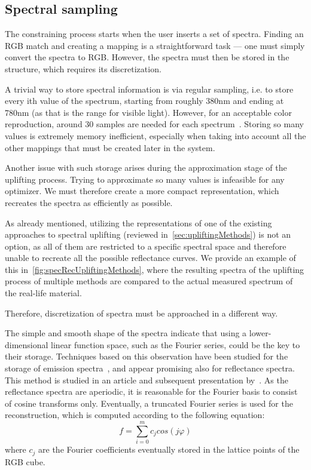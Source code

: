 \subsection{Spectral sampling}

The constraining process starts when the user inserts a set of spectra. Finding an RGB match and creating a mapping is a straightforward task --- one must simply convert the spectra to RGB. However, the spectra must then be stored in the structure, which requires its discretization.

A trivial way to store spectral information is via regular sampling, i.e. to store every ith value of the spectrum, starting from roughly 380nm and ending at 780nm (as that is the range for visible light). However, for an acceptable color reproduction, around 30 samples are needed for each spectrum~\cite{trigonometricMomentsPresentation}. Storing so many values is extremely memory inefficient, especially when taking into account all the other mappings that must be created later in the system.

Another issue with such storage arises during the approximation stage of the uplifting process. Trying to approximate so many values is infeasible for any optimizer. We must therefore create a more compact representation, which recreates the spectra as efficiently as possible.

As already mentioned, utilizing the representations of one of the existing approaches to spectral uplifting (reviewed in~\cref{sec:upliftingMethods}) is not an option, as all of them are restricted to a specific spectral space and therefore unable to recreate all the possible reflectance curves. We provide an example of this in~\cref{fig:specRecUpliftingMethods}, where the resulting spectra of the uplifting process of multiple methods are compared to the actual measured spectrum of the real-life material.

Therefore, discretization of spectra must be approached in a different way.

The simple and smooth shape of the spectra indicate that using a lower-dimensional linear function space, such as the Fourier series, could be the key to their storage. Techniques based on this observation have been studied for the storage of emission spectra~\cite{fourierRepresEmission}, and appear promising also for reflectance spectra. This method is studied in an article and subsequent presentation by~\citet{trigonometricMomentsPresentation}. As the reflectance spectra are aperiodic, it is reasonable for the Fourier basis to consist of cosine transforms only. Eventually, a truncated Fourier series is used for the reconstruction, which is computed according to the following equation:
\begin{equation} \label{truncatedFourierSeries}
  f = \sum_{i=0}^{m}c_j cos(j\varphi)
\end{equation}
where $c_j$ are the Fourier coefficients eventually stored in the lattice points of the RGB cube.

